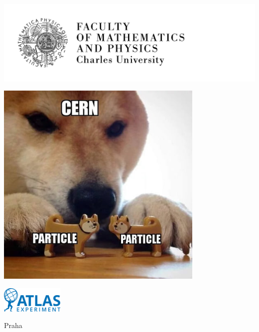 

\pagestyle{empty}
\hypersetup{pageanchor=false}

\begin{center}

\centerline{\mbox{\includegraphics[width=166mm]{../img/official/logo-en.pdf}}}


\vspace{-8mm}
\vfill
\vfill



{\bf\LARGE \NazevPrace}

\vspace{5mm}


\vspace{15mm}


\vspace{2mm}

\includegraphics[width=10cm]{../img/official/cern.jpg}

\vfill

\vfill

\vfill

\vfill

\vfill

\includegraphics[width=3cm]{../img/official/ATLAS.png}

Praha \year
\end{center}

